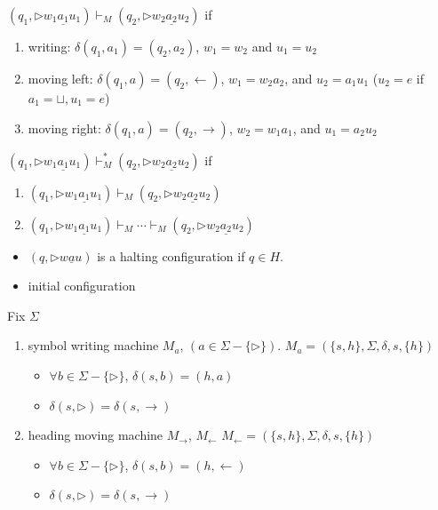 \begin{definition}
    \quad 

    $(q_1, \triangleright w_1 \underline{a_1} u_1)\vdash_M (q_2, \triangleright w_2 \underline{a_2} u_2)$ if 
    \begin{enumerate}
        \item writing: $\delta (q_1, a_1)=(q_2,a_2)$, $w_1=w_2$ and $u_1=u_2$
        \item moving left: $\delta(q_1, a)=(q_2,\leftarrow)$, $w_1=w_2a_2$, and $u_2=a_1 u_1$ ($u_2=e$ if $a_1=\sqcup, u_1=e$)
        \item moving right: $\delta(q_1, a)=(q_2,\rightarrow)$, $w_2=w_1a_1$, and $u_1=a_2 u_2$ 
    \end{enumerate}
\end{definition}

\begin{definition}[yields]
    \quad

    $(q_1, \triangleright w_1 \underline{a_1} u_1)\vdash_M^* (q_2, \triangleright w_2 \underline{a_2} u_2)$ if 
    \begin{enumerate}
        \item $(q_1, \triangleright w_1 \underline{a_1} u_1)\vdash_M (q_2, \triangleright w_2 \underline{a_2} u_2)$
        \item $(q_1, \triangleright w_1 \underline{a_1} u_1)\vdash_M \cdots \vdash_M (q_2, \triangleright w_2 \underline{a_2} u_2)$
    \end{enumerate}
\end{definition}

\begin{itemize}
    \item $(q, \triangleright w\underline{a}u)$ is a halting configuration if $q\in H$. 
    \item initial configuration %
\end{itemize}

Fix $\Sigma$
\begin{enumerate}
    \item symbol writing machine $M_a$, $(a\in \Sigma-\{ \triangleright \})$.
    \subitem $M_a=(\{s,h \},\Sigma, \delta, s, \{ h \})$
    \begin{itemize}
        \item $\forall b\in \Sigma-\{\triangleright\}$, $\delta(s,b)=(h,a)$
        \item $\delta(s,\triangleright)=\delta(s,\rightarrow)$
    \end{itemize}
    \item heading moving machine $M_{\rightarrow}$, $M_{\leftarrow}$
    \subitem $M_\leftarrow=(\{s,h \},\Sigma, \delta, s, \{ h \})$
    \begin{itemize}
        \item $\forall b\in \Sigma-\{\triangleright\}$, $\delta(s,b)=(h,\leftarrow)$
        \item $\delta(s,\triangleright)=\delta(s,\rightarrow)$
    \end{itemize}
\end{enumerate}

